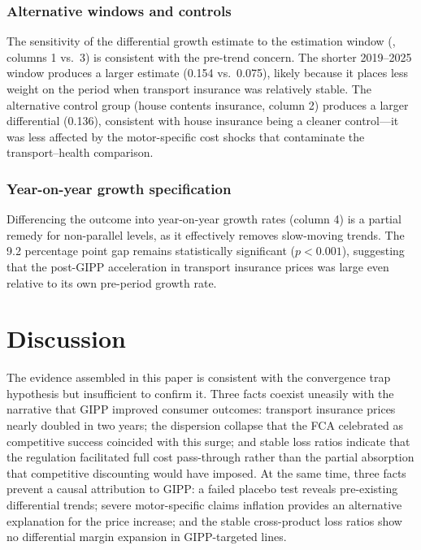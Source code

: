 \documentclass[12pt]{article}
\begin{document}
\subsubsection*{Alternative windows and controls} The sensitivity of the differential growth estimate to the estimation window (, columns 1 vs.\ 3) is consistent with the pre-trend concern. The shorter 2019--2025 window produces a larger estimate (0.154 vs.\ 0.075), likely because it places less weight on the period when transport insurance was relatively stable. The alternative control group (house contents insurance, column 2) produces a larger differential (0.136), consistent with house insurance being a cleaner control---it was less affected by the motor-specific cost shocks that contaminate the transport--health comparison.

\subsubsection*{Year-on-year growth specification} Differencing the outcome into year-on-year growth rates (column 4) is a partial remedy for non-parallel levels, as it effectively removes slow-moving trends. The 9.2 percentage point gap remains statistically significant ($p < 0.001$), suggesting that the post-GIPP acceleration in transport insurance prices was large even relative to its own pre-period growth rate.


\section{Discussion}

The evidence assembled in this paper is consistent with the convergence trap hypothesis but insufficient to confirm it. Three facts coexist uneasily with the narrative that GIPP improved consumer outcomes: transport insurance prices nearly doubled in two years; the dispersion collapse that the FCA celebrated as competitive success coincided with this surge; and stable loss ratios indicate that the regulation facilitated full cost pass-through rather than the partial absorption that competitive discounting would have imposed. At the same time, three facts prevent a causal attribution to GIPP: a failed placebo test reveals pre-existing differential trends; severe motor-specific claims inflation provides an alternative explanation for the price increase; and the stable cross-product loss ratios show no differential margin expansion in GIPP-targeted lines.
\end{document}
